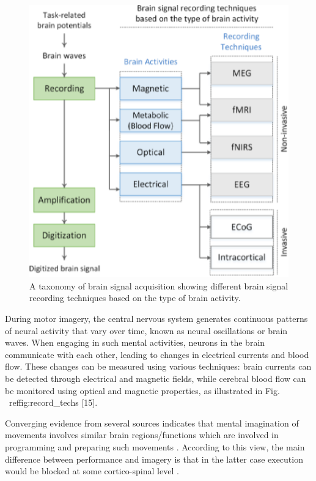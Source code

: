 \documentclass[journal,twocolumn]{IEEEtran}
\begin{document}
\begin{figure}[htbp]  %
  \centering  %
  \includegraphics[width=\linewidth]{figures/fig4.eps}  %
  \caption{A taxonomy of brain signal acquisition showing different brain signal recording techniques based on the type of brain activity.}  %
  \label{fig:record_techs}  %
\end{figure}

During motor imagery, the central nervous system generates continuous patterns of neural activity that vary over time, known as neural oscillations or brain waves. When engaging in such mental activities, neurons in the brain communicate with each other, leading to changes in electrical currents and blood flow. These changes can be measured using various techniques: brain currents can be detected through electrical and magnetic fields, while cerebral blood flow can be monitored using optical and magnetic properties, as illustrated in Fig. ~ref{fig:record_techs} [15].

Converging evidence from several sources indicates that mental imagination of movements involves similar brain regions/functions which are involved in programming and preparing such movements \cite{jeannerod1995mental}. According to this view, the main difference between performance and imagery is that in the latter case execution would be blocked at some cortico-spinal level \cite{decety1994mapping}.
\end{document}
